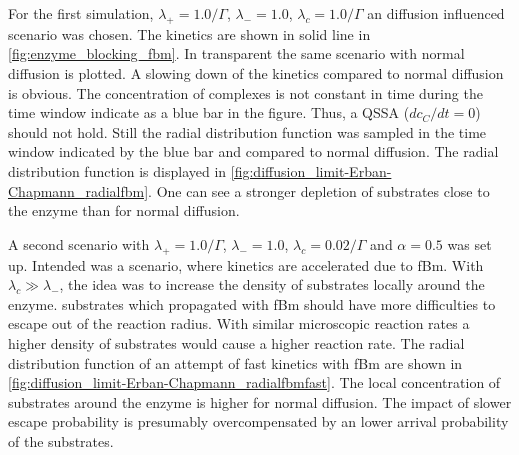 \documentclass[
  a4paper,BCOR10mm,twoside,
  headsepline,footsepline,%
  fleqn,openbib
]{scrbook}
\begin{document}
For the first simulation, $\lambda_+=1.0/\Gamma$, $\lambda_-=1.0$,  $\lambda_c=1.0/\Gamma$ 
an diffusion influenced scenario was chosen. The kinetics are shown in solid line in \cref{fig:enzyme_blocking_fbm}. In transparent the same scenario with normal diffusion is plotted. A slowing down of the kinetics compared to normal diffusion is obvious. The concentration of complexes is not constant in time during the time window indicate as a blue bar in the figure. Thus, a QSSA ($dc_C/dt=0$) should not hold. Still the radial distribution function was sampled in the time window indicated by the blue bar and compared to normal diffusion. The radial distribution function is displayed in \cref{fig:diffusion_limit-Erban-Chapmann_radialfbm}. One can see a stronger depletion of substrates close to the enzyme than for normal diffusion. \par
A second scenario with $\lambda_+=1.0/\Gamma$, $\lambda_-=1.0$,  $\lambda_c=0.02/\Gamma$  and $\alpha=0.5$ was set up. Intended was a scenario, where kinetics are accelerated due to fBm. With $\lambda_c \gg\lambda_-$, the idea was to increase the density of substrates locally around the enzyme. substrates which propagated with fBm should have more difficulties to escape out of the reaction radius. With similar microscopic reaction rates a higher density of substrates would cause a higher reaction rate. The radial distribution function of an attempt of fast kinetics with fBm are shown in \cref{fig:diffusion_limit-Erban-Chapmann_radialfbmfast}. The local concentration of substrates around the enzyme is higher for normal diffusion. The impact of slower escape probability is presumably overcompensated by an lower arrival probability of the substrates.
\end{document}

